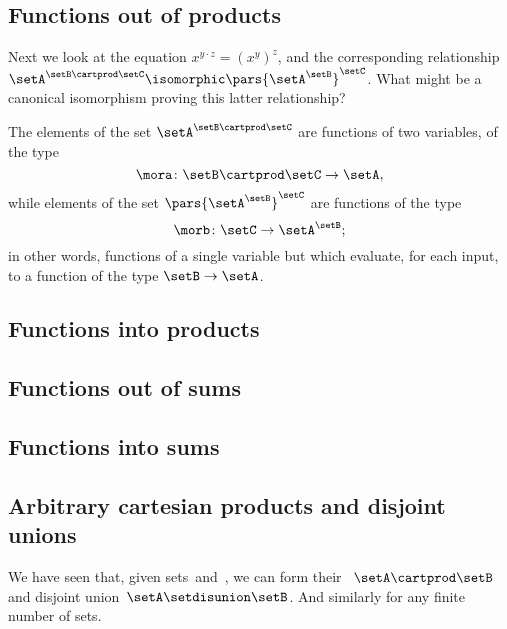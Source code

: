 \begin{solution}
\end{solution}

\subsection{Functions out of products}

Next we look at the equation $x^{y \cdot z} = (x^y)^z$, and the corresponding relationship $ \setA^{\setB \cartprod \setC}  \isomorphic \pars{\setA^\setB}^\setC$. What might be a canonical isomorphism proving this latter relationship?

The elements of the set $ \setA^{\setB \cartprod \setC}$ are functions of two variables, of the type
\begin{equation}
\mora \colon \setB \cartprod \setC \to \setA,
\end{equation}
while elements of the set $\pars{\setA^\setB}^\setC$ are functions of the type
\begin{equation}
\morb \colon \setC \to \setA^\setB;
\end{equation}
in other words, functions of a single variable but which evaluate, for each input, to a function of the type $\setB \to \setA$. 


\subsection{Functions into products}


\subsection{Functions out of sums}


\subsection{Functions into sums}



\subsection{Arbitrary cartesian products and disjoint unions}

We have seen that, given sets~\setA and~\setB, we can form their ~$\setA \cartprod \setB$ and disjoint union~$\setA \setdisunion \setB$.
And similarly for any finite number of sets.

